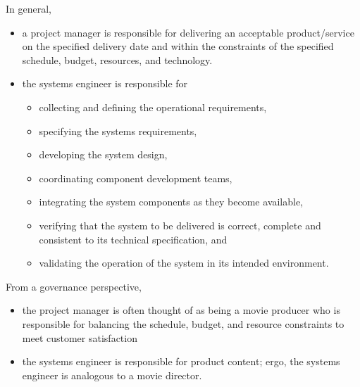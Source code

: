 \documentclass[letterpaper,10pt,english]{jupyterBook}
\begin{document}
\sphinxAtStartPar
In general,
\begin{itemize}
\item {} 
\sphinxAtStartPar
a project manager is responsible for delivering an acceptable product/service on the specified delivery date and within the constraints of the specified schedule, budget, resources, and technology.

\item {} 
\sphinxAtStartPar
the systems engineer is responsible for
\begin{itemize}
\item {} 
\sphinxAtStartPar
collecting and defining the operational requirements,

\item {} 
\sphinxAtStartPar
specifying the systems requirements,

\item {} 
\sphinxAtStartPar
developing the system design,

\item {} 
\sphinxAtStartPar
coordinating component development teams,

\item {} 
\sphinxAtStartPar
integrating the system components as they become available,

\item {} 
\sphinxAtStartPar
verifying that the system to be delivered is correct, complete and consistent to its technical specification, and

\item {} 
\sphinxAtStartPar
validating the operation of the system in its intended environment.

\end{itemize}

\end{itemize}

\sphinxAtStartPar
From a governance perspective,
\begin{itemize}
\item {} 
\sphinxAtStartPar
the project manager is often thought of as being a movie producer who is responsible for balancing the schedule, budget, and resource constraints to meet customer satisfaction

\item {} 
\sphinxAtStartPar
the systems engineer is responsible for product content; ergo, the systems engineer is analogous to a movie director.

\end{itemize}
\end{document}
